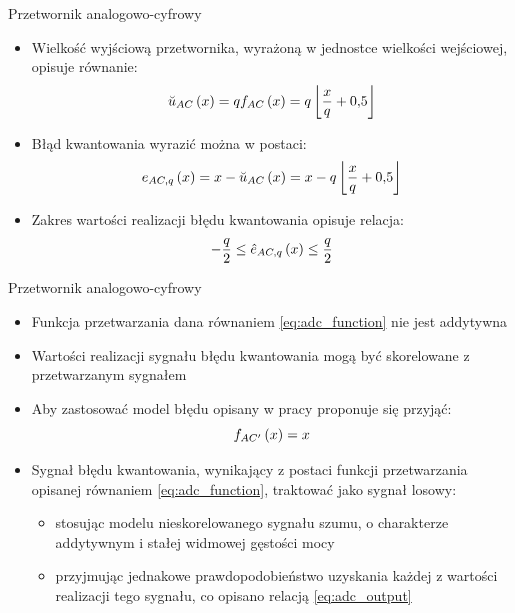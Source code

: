 \documentclass[12pt, polish, aspectratio = 169]{beamer}
\begin{document}
\begin{frame}{Przetwornik analogowo-cyfrowy}
\begin{itemize}
\item Wielkość wyjściową przetwornika, wyrażoną w jednostce wielkości wejściowej, opisuje równanie:
\begin{equation}
\breve{u}_{AC} \left(x\right) = q f_{AC} \left(x\right) = q \left\lfloor \frac{x}{q} + \num{0.5} \right\rfloor \label{eq:adc_output}
\end{equation}
\item Błąd kwantowania wyrazić można w postaci:
\begin{equation}
e_{AC,q} \left(x\right) = x - \breve{u}_{AC} \left(x\right) = x - q \left\lfloor \frac{x}{q} + \num{0.5} \right\rfloor \label{eq:adc_qerror}
\end{equation}
\item Zakres wartości realizacji błędu kwantowania opisuje relacja:
\begin{equation}
-\frac{q}{2} \le \hat{e}_{AC,q} \left(x\right) \le \frac{q}{2} \label{eq:adc_qerrrange}
\end{equation}
\end{itemize}
\end{frame}

\begin{frame}{Przetwornik analogowo-cyfrowy}
\begin{itemize}
\item Funkcja przetwarzania dana równaniem \eqref{eq:adc_function} nie jest addytywna
\item Wartości realizacji sygnału błędu kwantowania mogą być skorelowane z przetwarzanym sygnałem
\item Aby zastosować model błędu opisany w pracy proponuje się przyjąć:
\begin{equation}
f_{AC'} \left(x\right) = x \label{eq:adc_simplify}
\end{equation}
\item Sygnał błędu kwantowania, wynikający z postaci funkcji przetwarzania opisanej równaniem \eqref{eq:adc_function}, traktować jako sygnał losowy:
	\begin{itemize}
	\item stosując modelu nieskorelowanego sygnału szumu, o charakterze addytywnym i stałej widmowej gęstości mocy
	\item przyjmując jednakowe prawdopodobieństwo uzyskania każdej z wartości realizacji tego sygnału, co opisano relacją \eqref{eq:adc_output}
	\end{itemize}
\end{itemize}
\end{frame}
\end{document}
